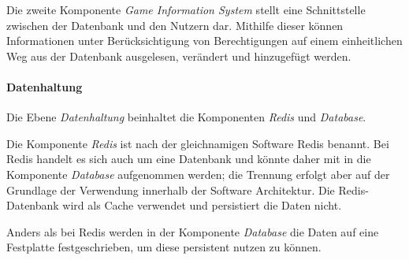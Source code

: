Die zweite Komponente \textit{Game Information System} stellt eine Schnittstelle zwischen der Datenbank und den Nutzern dar. Mithilfe dieser können Informationen unter Berücksichtigung von Berechtigungen auf einem einheitlichen Weg aus der Datenbank ausgelesen, verändert und hinzugefügt werden. 

\paragraph{Datenhaltung}
Die Ebene \textit{Datenhaltung} beinhaltet die Komponenten \textit{Redis} und \textit{Database}. 

Die Komponente \textit{Redis} ist nach der gleichnamigen Software Redis benannt. Bei Redis handelt es sich auch um eine Datenbank und könnte daher mit in die Komponente \textit{Database} aufgenommen werden; die Trennung erfolgt aber auf der Grundlage der Verwendung innerhalb der Software Architektur. Die Redis-Datenbank wird als Cache verwendet und persistiert die Daten nicht.

Anders als bei Redis werden in der Komponente \textit{Database} die Daten auf eine Festplatte festgeschrieben, um diese persistent nutzen zu können.